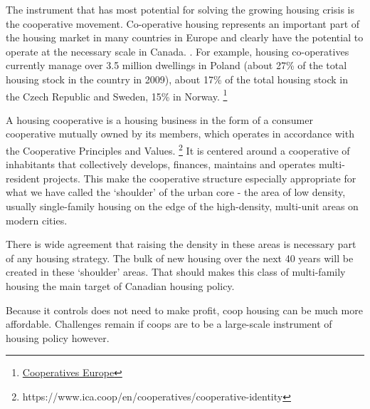  The instrument that has most potential for solving the growing housing crisis is the cooperative movement. Co-operative housing represents an important part of the housing market in many countries in Europe and clearly have the potential to operate at the necessary scale in Canada. . For example, housing co-operatives currently manage over 3.5 million dwellings in Poland (about 27\% of the total housing stock in the country in 2009), about 17\% of the total housing stock in the Czech Republic and Sweden, 15\% in Norway.
 \footnote{\href{https://coopseurope.coop/cooperative-housing-key-model-sustainable-housing-europe-organised-cecodhas-housing/}{Cooperatives Europe}}

 A housing cooperative is a housing business in the form of a consumer cooperative mutually owned by its members, which operates in accordance with the Cooperative Principles and Values. 
 \footnote{https://www.ica.coop/en/cooperatives/cooperative-identity}
  It is centered around a cooperative of inhabitants that collectively develops, finances, maintains and operates multi-resident projects. This make the cooperative structure  especially appropriate for what we have called the `shoulder' of the urban core - the area of low density, usually single-family housing on the edge of the high-density, multi-unit areas on modern cities. 
 
 There is wide agreement that raising the density in these areas is necessary part of any housing strategy. The bulk of new housing over the next 40 years will be created in these `shoulder' areas. That should makes this class of multi-family housing the main target of Canadian housing policy. 
 
 Because it controls  does not need to make profit, coop housing can be much more affordable. Challenges remain if coops are to be a large-scale instrument of housing policy however. 
 
